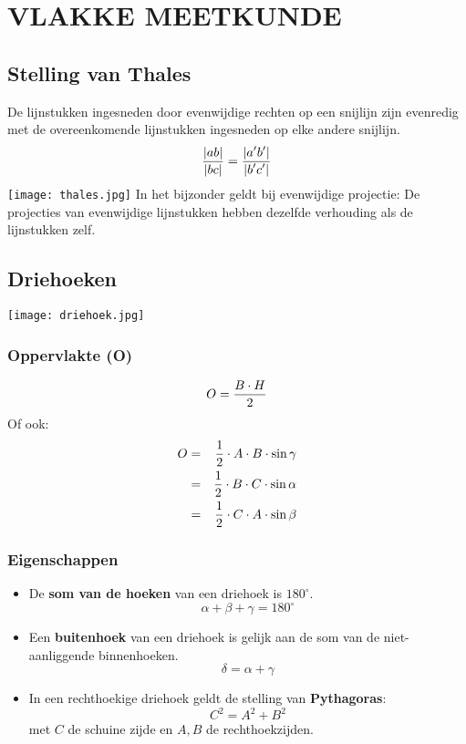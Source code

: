 \section{VLAKKE MEETKUNDE} \label{vlakke meetkunde}
\hypertarget{vlakke_meetkunde}{}

\subsection{Stelling van Thales} \label{thales}
\hypertarget{thales}{}
De lijnstukken ingesneden door evenwijdige rechten op een snijlijn zijn evenredig met de overeenkomende lijnstukken ingesneden op elke andere snijlijn.
\[\displaystyle\frac{\displaystyle |ab|}{\displaystyle |bc|}=\displaystyle\frac{\displaystyle |a'b'|}{\displaystyle |b'c'|}\]
\texttt{[image: thales.jpg]}
In het bijzonder geldt bij evenwijdige projectie:
De projecties van evenwijdige lijnstukken hebben dezelfde verhouding als de lijnstukken zelf.

\subsection{Driehoeken} \label{driehoeken}
\hypertarget{driehoeken}{}

\texttt{[image: driehoek.jpg]}

\subsubsection{Oppervlakte (O)} \label{oppervlakte driehoek}
\hypertarget{oppervlakte_driehoek}{}
	\[O=\displaystyle\frac{\displaystyle B\cdot H}{\displaystyle 2}\]
	Of ook:\newline\label{alternatief}
	\begin{eqnarray*}
	O &=&\displaystyle\frac{\displaystyle 1}{\displaystyle 2}\cdot A\cdot B\cdot \sin\gamma \\
	  &=&\displaystyle\frac{\displaystyle 1}{\displaystyle 2}\cdot B\cdot C\cdot \sin\alpha \\
	  &=&\displaystyle\frac{\displaystyle 1}{\displaystyle 2}\cdot C\cdot A\cdot \sin\beta \\
	\end{eqnarray*}

\subsubsection{Eigenschappen} \label{eigenschappen}
\hypertarget{eigenschappen}{}
		\begin{itemize}%
		\item De {\bf som van de hoeken} van een driehoek is 	$180^{\circ}$.
		\[\alpha+\beta+\gamma=180^{\circ}\]
		\item Een \hypertarget{buitenhoek}{{\bf buitenhoek}} \label{buitenhoek} van een driehoek is gelijk aan de som 		van de niet-aanliggende binnenhoeken.
		\[\delta=\alpha+\gamma\]
		\item In een rechthoekige driehoek geldt de stelling van \hypertarget{pythagoras}{{\bf Pythagoras}}: 		\label{Pythagoras} \[C^2=A^2+B^2\] met $C$ de schuine zijde en $A, B$ de 		rechthoekzijden.
		\end{itemize}%

